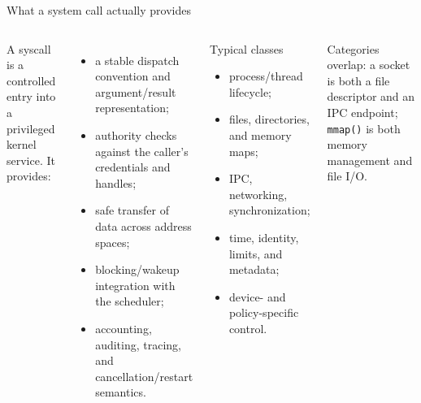 \documentclass[aspectratio=169,11pt]{beamer}
\newcommand{\code}[1]{\texttt{#1}}
\begin{document}
\begin{frame}{What a system call actually provides}
  \begin{columns}[T,onlytextwidth]
      A syscall is a controlled entry into a privileged kernel service. It provides:
      \begin{itemize}
        \item a stable dispatch convention and argument/result representation;
        \item authority checks against the caller's credentials and handles;
        \item safe transfer of data across address spaces;
        \item blocking/wakeup integration with the scheduler;
        \item accounting, auditing, tracing, and cancellation/restart semantics.
      \end{itemize}
      \begin{block}{Typical classes}
        \begin{itemize}
          \item process/thread lifecycle;
          \item files, directories, and memory maps;
          \item IPC, networking, synchronization;
          \item time, identity, limits, and metadata;
          \item device- and policy-specific control.
        \end{itemize}
      \end{block}
      \begin{tcolorbox}[title=Not a taxonomy law]
        Categories overlap: a socket is both a file descriptor and an IPC endpoint; \code{mmap()} is both memory management and file I/O.
      \end{tcolorbox}
  \end{columns}
\end{frame}
\end{document}
